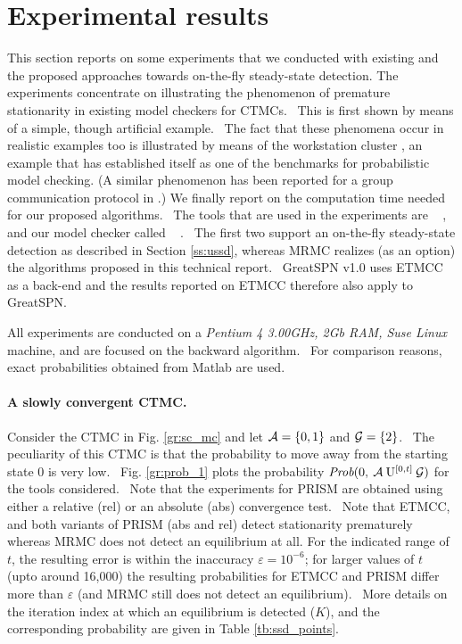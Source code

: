 \documentclass[a4paper,11pt]{article}
\newcommand{\Section}[1]{\section{#1}}
\begin{document}
\Section{Experimental results \label{s:examples}}
	This section reports on some experiments that we conducted with existing and the proposed approaches towards on-the-fly steady-state detection. The experiments concentrate on illustrating the phenomenon of premature stationarity in existing model checkers for CTMCs.  This is first shown by means of a simple, though artificial example.  The fact that these phenomena occur in realistic examples too is illustrated by means of the workstation cluster \cite{HaverkortHK_SRDS00, BuchholzKKT_JLAP03, YounesKNP_TACAS04, KwiatkowskaNP_IMTTCPE02, Prism_WC05}, an example that has established itself as one of the benchmarks for probabilistic model checking. (A similar phenomenon has been reported for a group communication protocol in \cite{MassinkKL_DSN04}.) We finally report on the computation time needed for our proposed algorithms.  The tools that are used in the experiments are \prism~ \cite{KwiatkowskaNP_QEST04}, \etmcc~ \cite{HermansKMS_IJSTTT03} and our model checker called \mrmc~ \cite{KatoenKZ_QEST05}.  The first two support an on-the-fly steady-state detection as described in Section \ref{ss:ussd}, whereas MRMC realizes (as an option) the algorithms proposed in this technical report.  GreatSPN v1.0 \cite{DAprileDS_DS04} uses ETMCC as a back-end and the results reported on ETMCC therefore also apply to GreatSPN.

	All experiments are conducted on a \emph{Pentium 4 3.00GHz, 2Gb RAM, Suse Linux} machine, and are focused on the backward algorithm.  For comparison reasons, exact probabilities obtained from Matlab are used.
	
	\paragraph{A slowly convergent CTMC.}
		Consider the CTMC in Fig. \ref{gr:sc_mc} and let $\mathcal{A} = \{0,1\}$ and $\mathcal{G} = \{2\}$.  The peculiarity of this CTMC is that the probability to move away from the starting state $0$ is very low.  Fig. \ref{gr:prob_1} plots the probability $\mbox{\it Prob}(0, \: \mathcal{A} \: \mathrm{U}^{[0,t]} \: \mathcal{G} )$ for the tools considered.  Note that the experiments for PRISM are obtained using either a relative (rel) or an absolute (abs) convergence test.  Note that ETMCC, and both variants of PRISM (abs and rel) detect stationarity prematurely whereas MRMC does not detect an equilibrium at all. For the indicated range of $t$, the resulting error is within the inaccuracy $\varepsilon = 10^{{-}6}$; for larger values of $t$ (upto around 16,000) the resulting probabilities for ETMCC and PRISM differ more than $\varepsilon$ (and MRMC still does not detect an equilibrium).  More details on the iteration index at which an equilibrium is detected ($K$), and the corresponding probability are given in Table \ref{tb:ssd_points}.
\end{document}
